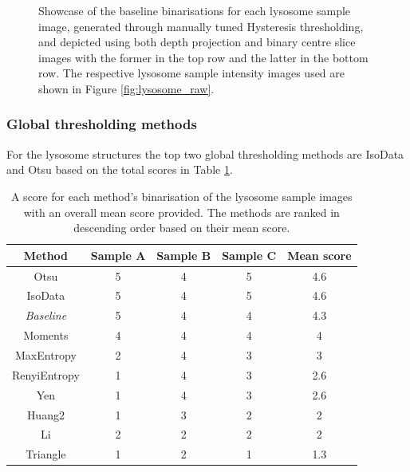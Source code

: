 \begin{figure}[ht!]
	\caption[Showcase of the baseline binarisations for each lysosome sample image.]{Showcase of the baseline binarisations for each lysosome sample image, generated through manually tuned Hysteresis thresholding, and depicted using both depth projection and binary centre slice images with the former in the top row and the latter in the bottom row. The respective lysosome sample intensity images used are shown in Figure \ref{fig:lysosome_raw}.}
	\label{fig:lyso_baseline}
\end{figure}

\subsubsection{Global thresholding methods}
For the lysosome structures the top two global thresholding methods are IsoData and Otsu based on the total scores in Table \ref{tab:lyso_global_ranks}.
\begin{table}[hb!]
	\centering
	\begin{tabular}{|c|c|c|c|c|}
		\hline
		\textbf{Method} & \textbf{Sample A} & \textbf{Sample B} & \textbf{Sample C} & \textbf{Mean score}\\
		\hline
		Otsu & 5 & 4 & 5 & 4.6 \\
		\hline
		IsoData & 5 & 4 & 5 & 4.6 \\
		\hline
		\textit{Baseline} & 5 & 4 & 4 & 4.3\\
		\hline
		Moments & 4 & 4 & 4 & 4 \\
		\hline
		MaxEntropy & 2 & 4 & 3 & 3 \\
		\hline
		RenyiEntropy & 1 & 4 & 3 & 2.6 \\
		\hline
		Yen & 1 & 4 & 3 & 2.6 \\
		\hline
		Huang2 & 1 & 3 & 2 & 2 \\
		\hline
		Li & 2 & 2 & 2 & 2 \\
		\hline
		Triangle & 1 & 2 & 1 & 1.3 \\
		\hline
		
	\end{tabular}
	\caption[A score for each method's binarisation of the lysosome sample images with an overall mean score provided.]{A score for each method's binarisation of the lysosome sample images with an overall mean score provided. The methods are ranked in descending order based on their mean score.}
	\label{tab:lyso_global_ranks}
\end{table}
\FloatBarrier
